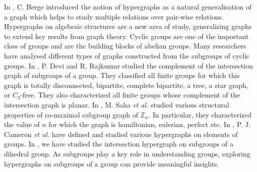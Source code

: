 \documentclass[11pt,a4paper]{article}
\theoremstyle{definition}
\theoremstyle{remark}
\begin{document}
		In \cite{berge}, C. Berge introduced the notion of hypergraphs as a natural generalisation of a graph which helps to study multiple relations over pair-wise relations. Hypergraphs on algebraic structures are a new area of study, generalizing graphs to extend key results from graph theory. Cyclic groups are one of the important class of groups and are the building blocks of abelian groups. Many researchers have analysed different types of graphs constructed from the subgroups of cyclic groups. In \cite{devicomplement}, P. Devi and R. Rajkumar studied the complement of the intersection graph of subgroups of a group. They classified all finite groups for which this graph is totally disconnected, bipartite, complete bipartite, a tree, a star graph, or 
		$C_3$-free. They also characterized all finite groups whose complement of the intersection graph is planar. In \cite{msaha}, M. Saha \textit{et al.} studied various structural properties of co-maximal subgroup graph of $\mathbb{Z}_n$.  In 
		particular, they characterized the value of $n$ for which the graph is hamiltonian, eulerian, perfect etc. In \cite{cameron2023hypergraphs}, P. J. Cameron \textit{et al.} have defined and studied various hypergraphs on elements of groups. In \cite{sb},  we have studied the intersection hypergraph on subgroups of a dihedral group. As subgroups play a key role in understanding groups, exploring hypergraphs on subgroups of a group can provide meaningful insights.
		
\end{document}
